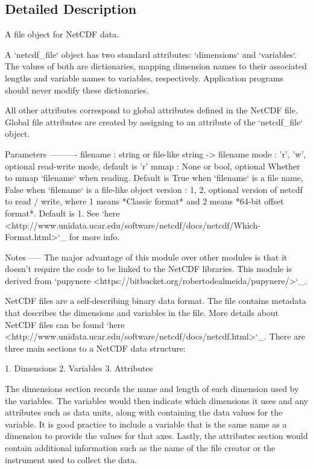 \subsection{Detailed Description}
\begin{DoxyVerb}A file object for NetCDF data.

A `netcdf_file` object has two standard attributes: `dimensions` and
`variables`. The values of both are dictionaries, mapping dimension
names to their associated lengths and variable names to variables,
respectively. Application programs should never modify these
dictionaries.

All other attributes correspond to global attributes defined in the
NetCDF file. Global file attributes are created by assigning to an
attribute of the `netcdf_file` object.

Parameters
----------
filename : string or file-like
    string -> filename
mode : {'r', 'w'}, optional
    read-write mode, default is 'r'
mmap : None or bool, optional
    Whether to mmap `filename` when reading.  Default is True
    when `filename` is a file name, False when `filename` is a
    file-like object
version : {1, 2}, optional
    version of netcdf to read / write, where 1 means *Classic
    format* and 2 means *64-bit offset format*.  Default is 1.  See
    `here <http://www.unidata.ucar.edu/software/netcdf/docs/netcdf/Which-Format.html>`_
    for more info.

Notes
-----
The major advantage of this module over other modules is that it doesn't
require the code to be linked to the NetCDF libraries. This module is
derived from `pupynere <https://bitbucket.org/robertodealmeida/pupynere/>`_.

NetCDF files are a self-describing binary data format. The file contains
metadata that describes the dimensions and variables in the file. More
details about NetCDF files can be found `here
<http://www.unidata.ucar.edu/software/netcdf/docs/netcdf.html>`_. There
are three main sections to a NetCDF data structure:

1. Dimensions
2. Variables
3. Attributes

The dimensions section records the name and length of each dimension used
by the variables. The variables would then indicate which dimensions it
uses and any attributes such as data units, along with containing the data
values for the variable. It is good practice to include a
variable that is the same name as a dimension to provide the values for
that axes. Lastly, the attributes section would contain additional
information such as the name of the file creator or the instrument used to
collect the data.


\end{DoxyVerb}
